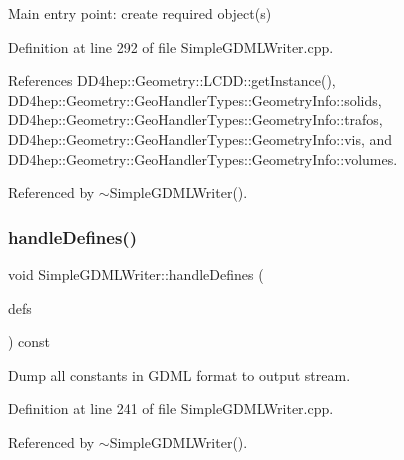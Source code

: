 Main entry point\+: create required object(s) 



Definition at line 292 of file Simple\+G\+D\+M\+L\+Writer.\+cpp.



References D\+D4hep\+::\+Geometry\+::\+L\+C\+D\+D\+::get\+Instance(), D\+D4hep\+::\+Geometry\+::\+Geo\+Handler\+Types\+::\+Geometry\+Info\+::solids, D\+D4hep\+::\+Geometry\+::\+Geo\+Handler\+Types\+::\+Geometry\+Info\+::trafos, D\+D4hep\+::\+Geometry\+::\+Geo\+Handler\+Types\+::\+Geometry\+Info\+::vis, and D\+D4hep\+::\+Geometry\+::\+Geo\+Handler\+Types\+::\+Geometry\+Info\+::volumes.



Referenced by $\sim$\+Simple\+G\+D\+M\+L\+Writer().

\hypertarget{class_d_d4hep_1_1_geometry_1_1_simple_g_d_m_l_writer_a5880f6b194754a31ae10ba2bcab27cc4}{}\label{class_d_d4hep_1_1_geometry_1_1_simple_g_d_m_l_writer_a5880f6b194754a31ae10ba2bcab27cc4} 
\subsubsection{\texorpdfstring{handle\+Defines()}{handleDefines()}}
{\footnotesize\ttfamily void Simple\+G\+D\+M\+L\+Writer\+::handle\+Defines (\begin{DoxyParamCaption}\item[{const \hyperlink{class_d_d4hep_1_1_geometry_1_1_geo_handler_types_a960cd930e1a491fc9a6afa5058865b4e}{Definition\+Set} \&}]{defs }\end{DoxyParamCaption}) const\hspace{0.3cm}{\ttfamily [virtual]}}



Dump all constants in G\+D\+ML format to output stream. 



Definition at line 241 of file Simple\+G\+D\+M\+L\+Writer.\+cpp.



Referenced by $\sim$\+Simple\+G\+D\+M\+L\+Writer().

\hypertarget{class_d_d4hep_1_1_geometry_1_1_simple_g_d_m_l_writer_a9b5b31b1ed94f429a53665ddaabcd80d}{}\label{class_d_d4hep_1_1_geometry_1_1_simple_g_d_m_l_writer_a9b5b31b1ed94f429a53665ddaabcd80d} 
